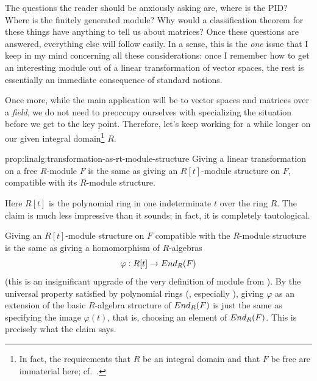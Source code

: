 The questions the reader should be anxiously asking are, where is the
PID? Where is the finitely generated module? Why would a
classification theorem for these things have anything to tell us about
matrices? Once these questions are answered, everything else will
follow easily. In a sense, this is the \emph{one} issue that I keep in
my mind concerning all these considerations: once I remember how to
get an interesting module out of a linear transformation of vector
spaces, the rest is essentially an immediate consequence of standard
notions.

Once more, while the main application will be to vector spaces and
matrices over a \emph{field}, we do not need to preoccupy ourselves
with specializing the situation before we get to the key
point. Therefore, let's keep working for a while longer on our given
integral domain\footnote{In fact, the requirements that $R$ be an
  integral domain and that $F$ be free are immaterial here; cf.\
  .} $R$.

\begin{prop}{}{prop:linalg:transformation-as-rt-module-structure}
  Giving a linear transformation on a free $R$-module $F$ is the same
  as giving an $R[t]$-module structure on $F$, compatible with its
  $R$-module structure.
\end{prop}

Here $R[t]$ is the polynomial ring in one indeterminate $t$ over the
ring $R$. The claim is much less impressive than it sounds; in fact,
it is completely tautological.

Giving an $R[t]$-module structure on $F$ compatible with the
$R$-module structure is the same as giving a homomorphism of
$R$-algebras
\[
  \varphi : R[t] \to End_R(F)
\]
(this is an insignificant upgrade of the very definition of module
from \Cref{subsec:rings:definition-of-left-r-module}). By the
universal property satisfied by polynomial rings
(,
especially ), giving $\varphi$
as an extension of the basic $R$-algebra structure of $End_R(F)$ is
just the same as specifying the image $\varphi(t)$, that is, choosing
an element of $End_R(F)$. This is precisely what the claim says.

